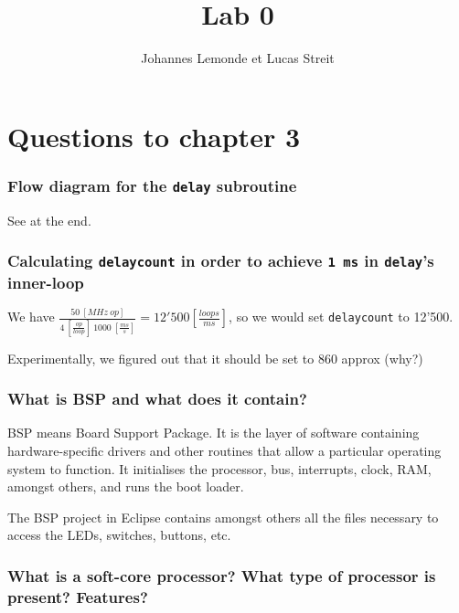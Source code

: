 \documentclass[a4paper,10pt]{article}
\title{Lab 0}
\author{Johannes Lemonde et Lucas Streit}
\begin{document}
\maketitle


\setcounter{section}{2}
\section{Questions to chapter 3}
\setcounter{subsection}{1}
\subsubsection{Flow diagram for the \texttt{delay} subroutine}

See at the end.

\subsubsection{Calculating \texttt{delaycount} in order to achieve \texttt{1 ms} in \texttt{delay}'s inner-loop}

We have \( \frac{50~[MHz~op]}{4~[\frac{op}{loop}]~1000~[\frac{ms}{s}]} = 12'500 [\frac{loops}{ms}] \), so we would set \texttt{delaycount} to 12'500.

Experimentally, we figured out that it should be set to 860 approx (why?)



\setcounter{subsection}{2}
\setcounter{subsubsection}{0}



\subsubsection{What is BSP and what does it contain?}

BSP means Board Support Package. It is the layer of software containing hardware-specific drivers and other routines that allow a particular operating system to function. It initialises the processor, bus, interrupts, clock, RAM, amongst others, and runs the boot loader.

The BSP project in Eclipse contains amongst others all the files necessary to access the LEDs, switches, buttons, etc.

\subsubsection{What is a soft-core processor? What type of processor is present? Features?}
\end{document}
